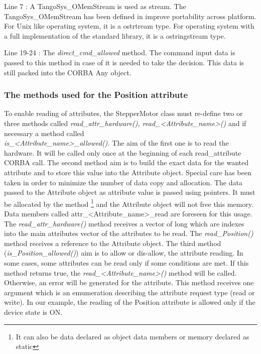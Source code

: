 Line 7 : A TangoSys\_OMemStream is used as stream. The TangoSys\_OMemStream
has been defined in improve portability across platform. For Unix
like operating system, it is a ostrtream type. For operating system
with a full implementation of the standard library, it is a ostringstream
type.

Line 19-24 : The \emph{direct\_cmd\_allowed} method. The command input
data is passed to this method in case of it is needed to take the
decision. This data is still packed into the CORBA Any object.


\subsubsection{The methods used for the Position attribute}

To enable reading of attributes, the StepperMotor
class must re-define two or three methods called \emph{read\_attr\_hardware(),
read\_<Attribute\_name>()} and if necessary
a method called \\
\emph{is\_<Attribute\_name>\_allowed().} The aim of the first one
is to read the hardware. It will be called only once at the beginning
of each read\_attribute CORBA call. The second method aim is to build
the exact data for the wanted attribute and to store this value into
the Attribute object. Special care has been taken in order to minimize
the number of data copy and allocation. The data passed to the Attribute
object as attribute value is passed using pointers. It must be allocated
by the method%
\footnote{It can also be data declared as object data members or memory declared
as static%
} and the Attribute object will not free this memory.
Data members called attr\_<Attribute\_name>\_read are foreseen for
this usage. The \emph{read\_attr\_hardware()} method receives a vector
of long which are indexes into the main attributes vector of the attributes
to be read. The \emph{read\_Position()} method receives a reference
to the Attribute object. The third method (\emph{is\_Position\_allowed()})
aim is to allow or dis-allow, the attribute reading. In some cases,
some attributes can be read only if some conditions are met. If this
method returns true, the \emph{read\_<Attribute\_name>()} method will
be called. Otherwise, an error will be generated for the attribute.
This method receives one argument which is an emumeration describing
the attribute request type (read or write). In our example, the reading
of the Position attribute is allowed only if the device state is ON.

